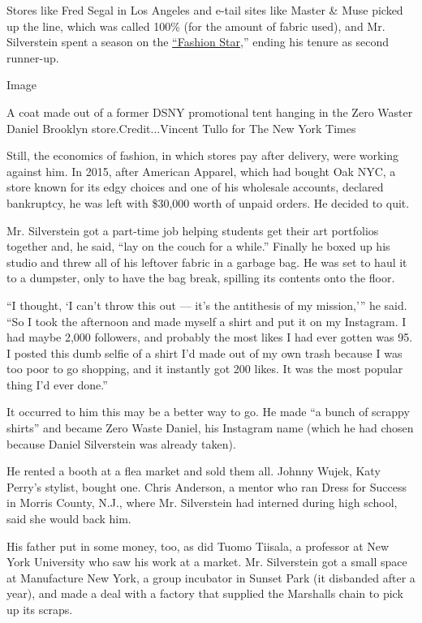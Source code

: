 Stores like Fred Segal in Los Angeles and e-tail sites like Master \&
Muse picked up the line, which was called 100\% (for the amount of
fabric used), and Mr. Silverstein spent a season on the
\href{https://www.nytimes.com/2012/03/13/arts/television/fashion-star-designer-competition-series-on-nbc.html}{``Fashion
Star},'' ending his tenure as second runner-up.

Image

A coat made out of a former DSNY promotional tent hanging in the Zero
Waster Daniel Brooklyn store.Credit...Vincent Tullo for The New York
Times

Still, the economics of fashion, in which stores pay after delivery,
were working against him. In 2015, after American Apparel, which had
bought Oak NYC, a store known for its edgy choices and one of his
wholesale accounts, declared bankruptcy, he was left with \$30,000 worth
of unpaid orders. He decided to quit.

Mr. Silverstein got a part-time job helping students get their art
portfolios together and, he said, ``lay on the couch for a while.''
Finally he boxed up his studio and threw all of his leftover fabric in a
garbage bag. He was set to haul it to a dumpster, only to have the bag
break, spilling its contents onto the floor.

``I thought, `I can't throw this out --- it's the antithesis of my
mission,''' he said. ``So I took the afternoon and made myself a shirt
and put it on my Instagram. I had maybe 2,000 followers, and probably
the most likes I had ever gotten was 95. I posted this dumb selfie of a
shirt I'd made out of my own trash because I was too poor to go
shopping, and it instantly got 200 likes. It was the most popular thing
I'd ever done.''

It occurred to him this may be a better way to go. He made ``a bunch of
scrappy shirts'' and became Zero Waste Daniel, his Instagram name (which
he had chosen because Daniel Silverstein was already taken).

He rented a booth at a flea market and sold them all. Johnny Wujek, Katy
Perry's stylist, bought one. Chris Anderson, a mentor who ran Dress for
Success in Morris County, N.J., where Mr. Silverstein had interned
during high school, said she would back him.

His father put in some money, too, as did Tuomo Tiisala, a professor at
New York University who saw his work at a market. Mr. Silverstein got a
small space at Manufacture New York, a group incubator in Sunset Park
(it disbanded after a year), and made a deal with a factory that
supplied the Marshalls chain to pick up its scraps.

